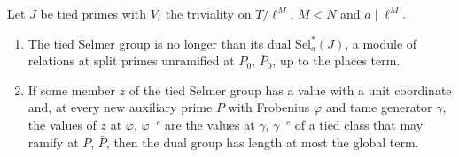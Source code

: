 \begin{theorem}\label{thm:selmer-count}
Let $J$ be tied primes with $V_i$ the triviality on $T/\ell^M$, $M<N$ and $a\mid\ell^M$.
\begin{enumerate}[label=\textup{(\alph*)}]
\item The tied Selmer group is no longer than its dual $\mathrm{Sel}^*_a(J)$, a module of relations at split primes unramified at $P_0$, $\bar P_0$, up to the places term.
\item If some member $z$ of the tied Selmer group has a value with a unit coordinate and, at every new auxiliary prime $P$ with Frobenius $\varphi$ and tame generator $\gamma$, the values of $z$ at $\varphi$, $\varphi^{-c}$ are the values at $\gamma$, $\gamma^{-c}$ of
a tied class that may ramify at $P$, $\bar P$, then the dual group has length at most the global term.
\end{enumerate}
\end{theorem}

